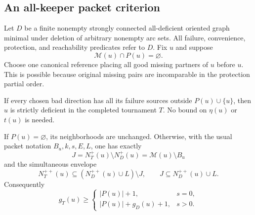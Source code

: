\subsection{An all-keeper packet criterion}
\label{sec:all-keeper-packet-criterion}

Let $D$ be a finite nonempty strongly connected all-deficient oriented
graph minimal under deletion of arbitrary nonempty arc sets. All
failure, convenience, protection, and reachability predicates refer
to $D$. Fix $u$ and suppose
\[
 \mathcal M(u)\cap P(u)=\varnothing.
 \tag{AK1}\label{eq:all-keeper-no-missing-far-in}
\]
Choose one canonical reference placing all good missing partners of
$u$ before $u$. This is possible because original missing pairs are
incomparable in the protection partial order.

\begin{lemma}
\label{lem:all-keeper-packet-completion}
If every chosen bad direction has all its failure sources outside
$P(u)\cup\{u\}$, then $u$ is strictly deficient in the completed
tournament $T$. No bound on $\eta(u)$ or $t(u)$ is needed.

If $P(u)=\varnothing$, its neighborhoods are unchanged. Otherwise,
with the usual packet notation $B_u,k,s,E,L$, one has exactly
\[
 J=N_T^+(u)\setminus N_D^+(u)=\mathcal M(u)\setminus B_u
 \tag{AK2}
\]
and the simultaneous envelope
\[
 N_T^{++}(u)\subseteq (N_D^{++}(u)\cup L)\setminus J,
 \qquad J\subseteq N_D^{++}(u)\cup L.
 \tag{AK3}
\]
Consequently
\[
 g_T(u)\ge
 \begin{cases}|P(u)|+1,&s=0,\\|P(u)|+g_D(u)+1,&s>0.\end{cases}
 \tag{AK4}
\]
\end{lemma}

